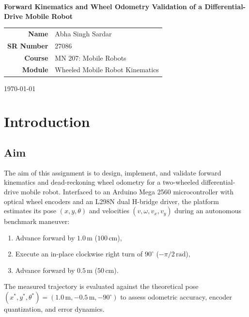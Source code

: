 \documentclass[11pt,a4paper]{article}
\begin{document}
\begin{titlepage}
\centering
\vspace*{2.5cm}
{\Huge\bfseries Forward Kinematics and Wheel Odometry Validation of a Differential-Drive Mobile Robot \par}
\vspace{2.2cm}
{\large
\begin{tabular}{rl}
\textbf{Name}      & Abha Singh Sardar  \\[6pt]
\textbf{SR Number} & 27086             \\[6pt]
\textbf{Course}    & MN 207: Mobile Robots \\[6pt]
\textbf{Module}    & Wheeled Mobile Robot Kinematics \\[6pt]
\end{tabular}\par}
\vspace{2.5cm}
{\large \today \par}
\vfill
\end{titlepage}

\newpage
{}

\section{Introduction}

\subsection{Aim}
The aim of this assignment is to design, implement, and validate forward kinematics and dead-reckoning wheel odometry for a two-wheeled differential-drive mobile robot. Interfaced to an Arduino Mega 2560 microcontroller with optical wheel encoders and an L298N dual H-bridge driver, the platform estimates its pose $(x, y, \theta)$ and velocities $(v, \omega, v_x, v_y)$ during an autonomous benchmark maneuver:
\begin{enumerate}[noitemsep,topsep=1pt]
    \item Advance forward by $1.0\,\text{m}$ ($100\,\text{cm}$),
    \item Execute an in-place clockwise right turn of $90^\circ$ ($-\pi/2\,\text{rad}$),
    \item Advance forward by $0.5\,\text{m}$ ($50\,\text{cm}$).
\end{enumerate}
The measured trajectory is evaluated against the theoretical pose $(x^*, y^*, \theta^*) = (1.0\,\text{m}, -0.5\,\text{m}, -90^\circ)$ to assess odometric accuracy, encoder quantization, and error dynamics.
\end{document}
